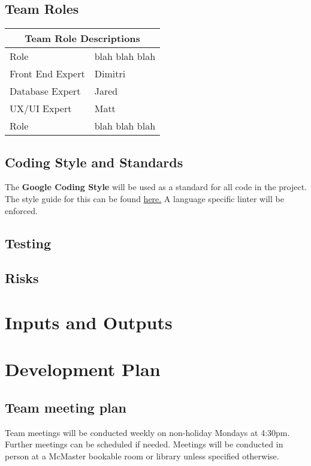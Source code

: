 \documentclass{article}
\begin{document}
\subsection{Team Roles}
\begin{tabular}{ |p{5cm}|p{8cm}| }
	\hline
	\multicolumn{2}{|c|}{Team Role Descriptions} \\
	\hline
	Role & blah blah blah \\
	\hline
	Front End Expert & Dimitri \\
	\hline
	Database Expert  & Jared \\
	\hline
	UX/UI Expert & Matt \\
	\hline
	Role & blah blah blah \\
	\hline
\end{tabular}

\subsection{Coding Style and Standards}
The \textbf{Google Coding Style} will be used as a standard for all code in the project. \\
The style guide for this can be found \hyperlink{https://google.github.io/styleguide/}{here.}
A language specific linter will be enforced.

\subsection{Testing}


\subsection {Risks}


	
	
	\section{Inputs and Outputs}
	
	\section {Development Plan}
	
	\subsection{Team meeting plan}
	Team meetings will be conducted weekly on non-holiday Mondays at 4:30pm.
	Further meetings can be scheduled if needed.
	Meetings will be conducted in person at a McMaster bookable room or library unless specified otherwise.
	
\end{document}
